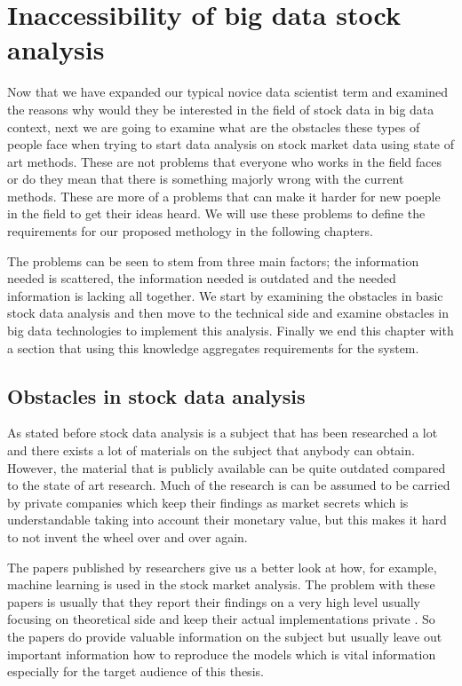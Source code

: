 \section{Inaccessibility of big data stock analysis}

Now that we have expanded our typical novice data scientist term and examined the reasons why would they be interested in the field of stock data in big data context, next we are going to examine what are the obstacles these types of people face when trying to start data analysis on stock market data using state of art methods.
These are not problems that everyone who works in the field faces or do they mean that there is something majorly wrong with the current methods.
These are more of a problems that can make it harder for new poeple in the field to get their ideas heard.
We will use these problems to define the requirements for our proposed methology in the following chapters.

The problems can be seen to stem from three main factors; the information needed is scattered, the information needed is outdated and the needed information is lacking all together.
We start by examining the obstacles in basic stock data analysis and then move to the technical side and examine obstacles in big data technologies to implement this analysis.
Finally we end this chapter with a section that using this knowledge aggregates requirements for the system.

\subsection{Obstacles in stock data analysis}

As stated before stock data analysis is a subject that has been researched a lot and there exists a lot of materials on the subject that anybody can obtain.
However, the material that is publicly available can be quite outdated compared to the state of art research.
Much of the research is can be assumed to be carried by private companies which keep their findings as market secrets which is understandable taking into account their monetary value, but this makes it hard to not invent the wheel over and over again.

The papers published by researchers give us a better look at how, for example, machine learning is used in the stock market analysis.
The problem with these papers is usually that they report their findings on a very high level usually focusing on theoretical side and keep their actual implementations private \cite{le} \cite{adresic} \cite{islam}.
So the papers do provide valuable information on the subject but usually leave out important information how to reproduce the models which is vital information especially for the target audience of this thesis.

